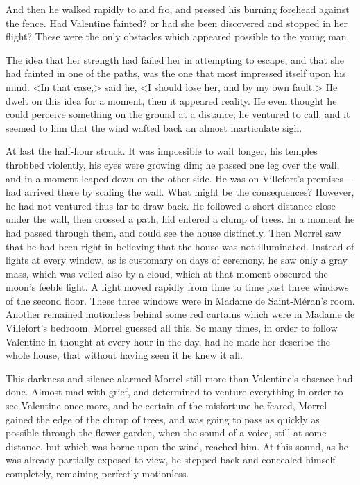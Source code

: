  And then he walked rapidly to and fro, and pressed his burning forehead against the fence. Had Valentine fainted? or had she been discovered and stopped in her flight? These were the only obstacles which appeared possible to the young man. 

 The idea that her strength had failed her in attempting to escape, and that she had fainted in one of the paths, was the one that most impressed itself upon his mind. <In that case,> said he, <I should lose her, and by my own fault.> He dwelt on this idea for a moment, then it appeared reality. He even thought he could perceive something on the ground at a distance; he ventured to call, and it seemed to him that the wind wafted back an almost inarticulate sigh. 

 At last the half-hour struck. It was impossible to wait longer, his temples throbbed violently, his eyes were growing dim; he passed one leg over the wall, and in a moment leaped down on the other side. He was on Villefort's premises—had arrived there by scaling the wall. What might be the consequences? However, he had not ventured thus far to draw back. He followed a short distance close under the wall, then crossed a path, hid entered a clump of trees. In a moment he had passed through them, and could see the house distinctly.  Then Morrel saw that he had been right in believing that the house was not illuminated. Instead of lights at every window, as is customary on days of ceremony, he saw only a gray mass, which was veiled also by a cloud, which at that moment obscured the moon's feeble light. A light moved rapidly from time to time past three windows of the second floor. These three windows were in Madame de Saint-Méran's room. Another remained motionless behind some red curtains which were in Madame de Villefort's bedroom. Morrel guessed all this. So many times, in order to follow Valentine in thought at every hour in the day, had he made her describe the whole house, that without having seen it he knew it all. 

 This darkness and silence alarmed Morrel still more than Valentine's absence had done. Almost mad with grief, and determined to venture everything in order to see Valentine once more, and be certain of the misfortune he feared, Morrel gained the edge of the clump of trees, and was going to pass as quickly as possible through the flower-garden, when the sound of a voice, still at some distance, but which was borne upon the wind, reached him. At this sound, as he was already partially exposed to view, he stepped back and concealed himself completely, remaining perfectly motionless. 

